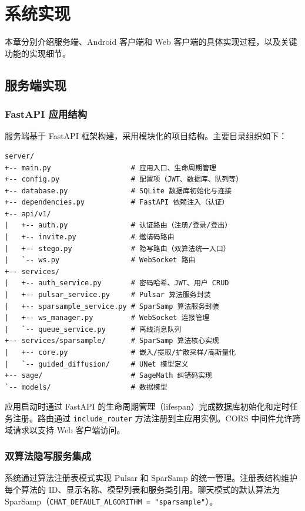\section{系统实现}\label{chap:implementation}

本章分别介绍服务端、Android 客户端和 Web 客户端的具体实现过程，以及关键功能的实现细节。

\subsection{服务端实现}

\subsubsection{FastAPI 应用结构}

服务端基于 FastAPI 框架构建，采用模块化的项目结构。主要目录组织如下：

\begin{lstlisting}[language={}]
server/
+-- main.py                   # 应用入口、生命周期管理
+-- config.py                 # 配置项（JWT、数据库、队列等）
+-- database.py               # SQLite 数据库初始化与连接
+-- dependencies.py           # FastAPI 依赖注入（认证）
+-- api/v1/
|   +-- auth.py               # 认证路由（注册/登录/登出）
|   +-- invite.py             # 邀请码路由
|   +-- stego.py              # 隐写路由（双算法统一入口）
|   `-- ws.py                 # WebSocket 路由
+-- services/
|   +-- auth_service.py       # 密码哈希、JWT、用户 CRUD
|   +-- pulsar_service.py     # Pulsar 算法服务封装
|   +-- sparsample_service.py # SparSamp 算法服务封装
|   +-- ws_manager.py         # WebSocket 连接管理
|   `-- queue_service.py      # 离线消息队列
+-- services/sparsample/      # SparSamp 算法核心实现
|   +-- core.py               # 嵌入/提取/扩散采样/高斯量化
|   `-- guided_diffusion/     # UNet 模型定义
+-- sage/                     # SageMath 纠错码实现
`-- models/                   # 数据模型
\end{lstlisting}

应用启动时通过 FastAPI 的生命周期管理（lifespan）完成数据库初始化和定时任务注册。路由通过 \texttt{include\_router} 方法注册到主应用实例。CORS 中间件允许跨域请求以支持 Web 客户端访问。

\subsubsection{双算法隐写服务集成}

系统通过算法注册表模式实现 Pulsar 和 SparSamp 的统一管理。注册表结构维护每个算法的 ID、显示名称、模型列表和服务类引用。聊天模式的默认算法为 SparSamp（\texttt{CHAT\_DEFAULT\_ALGORITHM = "sparsample"}）。

